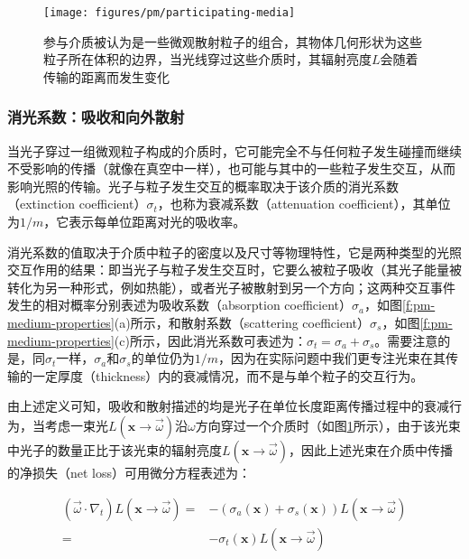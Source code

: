 \begin{figure}
	\sidecaption
	\texttt{[image: figures/pm/participating-media]}
	\caption{参与介质被认为是一些微观散射粒子的组合，其物体几何形状为这些粒子所在体积的边界，当光线穿过这些介质时，其辐射亮度$L$会随着传输的距离而发生变化}
	\label{f:pm-participating-media}
\end{figure}




\subsubsection{消光系数：吸收和向外散射}
当光子穿过一组微观粒子构成的介质时，它可能完全不与任何粒子发生碰撞而继续不受影响的传播（就像在真空中一样），也可能与其中的一些粒子发生交互，从而影响光照的传输。光子与粒子发生交互的概率取决于该介质的消光系数（extinction coefficient）$\sigma_t$，也称为衰减系数（attenuation coefficient），其单位为$1/m$，它表示每单位距离对光的吸收率。

消光系数的值取决于介质中粒子的密度以及尺寸等物理特性，它是两种类型的光照交互作用的结果：即当光子与粒子发生交互时，它要么被粒子吸收（其光子能量被转化为另一种形式，例如热能），或者光子被散射到另一个方向；这两种交互事件发生的相对概率分别表述为吸收系数（absorption coefficient）$\sigma_a$，如图\ref{f:pm-medium-properties}(a)所示，和散射系数（scattering coefficient）$\sigma_s$，如图\ref{f:pm-medium-properties}(c)所示，因此消光系数可表述为：$\sigma_t=\sigma_a+\sigma_s$。需要注意的是，同$\sigma_t$一样，$\sigma_a$和$\sigma_s$的单位仍为$1/m$，因为在实际问题中我们更专注光束在其传输的一定厚度（thickness）内的衰减情况，而不是与单个粒子的交互行为。

由上述定义可知，吸收和散射描述的均是光子在单位长度距离传播过程中的衰减行为，当考虑一束光$L(\mathbf{x}\to\vec{\omega})$沿$\omega$方向穿过一个介质时（如图\ref{f:pm-participating-media}所示），由于该光束中光子的数量正比于该光束的辐射亮度$L(\mathbf{x}\to\vec{\omega})$，因此上述光束在介质中传播的净损失（net loss）可用微分方程表述为：

\begin{equation}\label{e:pm-net-loss}
\begin{aligned}
	(\vec{\omega}\cdot\nabla_t)L(\mathbf{x}\to\vec{\omega})=&-(\sigma_a(\mathbf{x})+\sigma_s(\mathbf{x}))L(\mathbf{x}\to\vec{\omega})\\
	=&-\sigma_t(\mathbf{x})L(\mathbf{x}\to\vec{\omega})
\end{aligned}
\end{equation}

